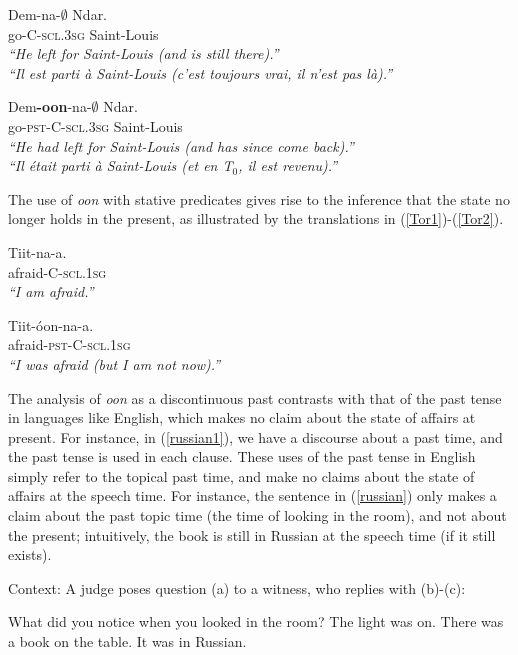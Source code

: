 \documentclass[output=paper
,modfonts
,nonflat]{langsci/langscibook}
\begin{document}
\ea
\gll Dem-na-$\emptyset$ Ndar.\\
go-C-\textsc{scl.3sg} Saint-Louis\\
\glt \textit{``He left for Saint-Louis (and is still there).''}\\
\textit{``Il est parti \`a Saint-Louis (c'est toujours vrai, il n'est
  pas l\`a).''} \hfill \citep[p.~279]{robert91approche}\label{Robert1}
\z

\ea
\gll Dem\textbf{-oon}-na-$\emptyset$ Ndar.\\
go-\textsc{pst}-C-\textsc{scl.3sg} Saint-Louis\\
\glt \textit{``He had left for Saint-Louis (and has since come
  back).''}\\\textit{``Il \'etait parti \`a Saint-Louis (et en T$_0$,
  il est revenu).''} \hfill \citep[p.~279]{robert91approche}\label{Robert2}
\z


The use of \textit{oon} with stative predicates gives rise to the inference that the state no longer holds in the present, as illustrated by the translations in (\ref{Tor1})-(\ref{Tor2}).

\ea
\gll Tiit-na-a.\\
afraid-C-\textsc{scl.1sg}\\
\glt \textit{``I am afraid.''}\hfill\citep[p.~25]{torrence12clause}\label{Tor1}
\z

\ea
\gll Tiit-\'oon-na-a.\\
afraid-\textsc{pst}-C-\textsc{scl.1sg}\\
\glt \textit{``I was afraid (but I am not now).''}\hfill\citep[p.~26]{torrence12clause}\label{Tor2}
\z

The analysis of \textit{oon} as a discontinuous past contrasts with that of the past tense in languages like English, which makes no claim about the state of affairs at present. For instance, in (\ref{russian1}), we have a discourse about a past time, and the past tense is used in each clause. These uses of the past tense in English simply refer to the topical past time, and make no claims about the state of affairs at the speech time. For instance, the sentence in (\ref{russian}) only makes a claim about the past topic time (the time of looking in the room), and not about the present; intuitively, the book is still in Russian at the speech time (if it still exists).

\begin{exe}
\ex\label{russian1} Context: A judge poses question (a) to a witness, who replies with (b)-(c):
\begin{xlist}
\ex What did you notice when you looked in the room?
\ex The light was on. There was a book on the table.
\ex\label{russian} It was in Russian. \hfill \citep{klein94time}
\end{xlist}
\end{exe}
\end{document}
